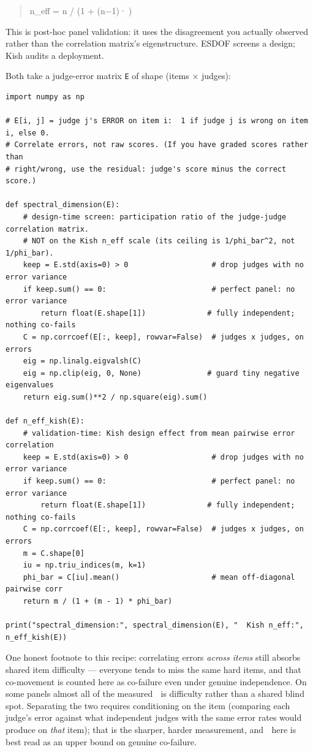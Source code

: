 \documentclass[11pt]{article}
\begin{document}
\begin{quote}\ttfamily
n\_eff = n / (1 + (n−1)·)\\
\end{quote}

This is post-hoc panel validation: it uses the disagreement you actually observed rather than the correlation matrix's eigenstructure. ESDOF screens a design; Kish audits a deployment.

Both take a judge-error matrix \texttt{E} of shape (items × judges):

\begin{lstlisting}
import numpy as np

# E[i, j] = judge j's ERROR on item i:  1 if judge j is wrong on item i, else 0.
# Correlate errors, not raw scores. (If you have graded scores rather than
# right/wrong, use the residual: judge's score minus the correct score.)

def spectral_dimension(E):
    # design-time screen: participation ratio of the judge-judge correlation matrix.
    # NOT on the Kish n_eff scale (its ceiling is 1/phi_bar^2, not 1/phi_bar).
    keep = E.std(axis=0) > 0                   # drop judges with no error variance
    if keep.sum() == 0:                        # perfect panel: no error variance
        return float(E.shape[1])              # fully independent; nothing co-fails
    C = np.corrcoef(E[:, keep], rowvar=False)  # judges x judges, on errors
    eig = np.linalg.eigvalsh(C)
    eig = np.clip(eig, 0, None)               # guard tiny negative eigenvalues
    return eig.sum()**2 / np.square(eig).sum()

def n_eff_kish(E):
    # validation-time: Kish design effect from mean pairwise error correlation
    keep = E.std(axis=0) > 0                   # drop judges with no error variance
    if keep.sum() == 0:                        # perfect panel: no error variance
        return float(E.shape[1])              # fully independent; nothing co-fails
    C = np.corrcoef(E[:, keep], rowvar=False)  # judges x judges, on errors
    m = C.shape[0]
    iu = np.triu_indices(m, k=1)
    phi_bar = C[iu].mean()                     # mean off-diagonal pairwise corr
    return m / (1 + (m - 1) * phi_bar)

print("spectral_dimension:", spectral_dimension(E), "  Kish n_eff:", n_eff_kish(E))
\end{lstlisting}

One honest footnote to this recipe: correlating errors \emph{across items} still absorbs shared item difficulty — everyone tends to miss the same hard items, and that co-movement is counted here as co-failure even under genuine independence. On some panels almost all of the measured  is difficulty rather than a shared blind spot. Separating the two requires conditioning on the item (comparing each judge's error against what independent judges with the same error rates would produce on \emph{that} item); that is the sharper, harder measurement, and  here is best read as an upper bound on genuine co-failure.
\end{document}
